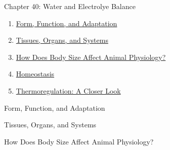 \documentclass[12pt,letterpaper]{article}
\newcommand{\thetitle}{\hypertarget{home}{How Animals Work}}
\begin{document}
\renewcommand{\thetitle}{\hypertarget{40}{Water and Electrolye Balance}}
\hypertarget{40}{}
\setcounter{section}{40}


\begin{chapbox}{Chapter 40: Water and Electrolye Balance}
    \begin{enumerate}
        \item \hyperlink{40.1}{Form, Function, and Adaptation}
        \item \hyperlink{40.2}{Tissues, Organs, and Systems}
        \item \hyperlink{40.3}{How Does Body Size Affect Animal Physiology?}
        \item \hyperlink{40.4}{Homeostasis}
        \item \hyperlink{40.5}{Thermoregulation: A Closer Look}
    \end{enumerate}
\end{chapbox}
\hypertarget{40.1}{}
\begin{secbox}{Form, Function, and Adaptation}{

}\end{secbox}
\hypertarget{40.2}{}
\begin{secbox}{Tissues, Organs, and Systems}{

}\end{secbox}
\hypertarget{40.3}{}
\begin{secbox}{How Does Body Size Affect Animal Physiology?}{

}\end{secbox}
\end{document}
